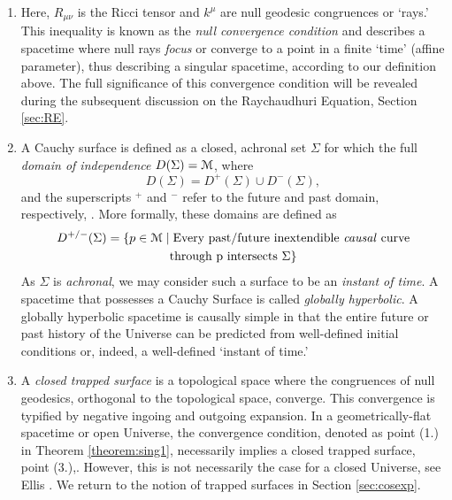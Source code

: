 \begin{enumerate}
\item Here, $R_{\mu\nu}$ is the Ricci tensor and $k^\mu$ are null geodesic congruences or `rays.' This inequality is known as the \emph{null convergence condition} and describes a spacetime where null rays \emph{focus} or converge to a point in a finite `time' (affine parameter), thus describing a singular spacetime,  according to our definition above. The full significance of this convergence condition will be revealed during the subsequent discussion on the Raychaudhuri Equation, Section \ref{sec:RE}.
\item A Cauchy surface is defined as a closed, achronal set $\Sigma$ for which the full \emph{domain of independence} $D(\Sigma)={\cal M}$, where 
\[
D(\Sigma)=D^+(\Sigma)\cup D^-(\Sigma)
,\]
and the superscripts $^+$ and $^-$ refer to the future and past domain, respectively, \cite{Wald:GR}. More formally, these domains are defined as
\begin{align}
D^{+/-}(\Sigma)=\{p\in {\cal M} \;|&\; \mbox{Every past/future inextendible \emph{causal} curve}
\\&\nonumber \mbox{through p intersects }\Sigma\}
\end{align}
As $\Sigma$ is \emph{achronal}, we may consider such a surface to be an \emph{instant of time}. A spacetime that possesses a Cauchy Surface is called \emph{globally hyperbolic}. A globally hyperbolic spacetime is causally simple in that the entire future or past history of the Universe can be predicted from well-defined initial conditions \cite{Narita:1998pt} or, indeed, a well-defined `instant of time.'
\item A \emph{closed trapped surface} is a topological space where the congruences of null geodesics, orthogonal to the topological space, converge. This convergence is typified by  negative ingoing and outgoing expansion. In a geometrically-flat spacetime or open Universe, the convergence condition, denoted as point (1.) in Theorem \ref{theorem:sing1},  necessarily implies a closed trapped surface, point (3.)\cite{Vilenkin:2013tua},\cite{Hawking:1973uf}. However, this is not necessarily the case for a closed Universe, see Ellis \cite{Ellis:2003mb}. We return to the notion of trapped surfaces in Section \ref{sec:cosexp}.
\end{enumerate}

